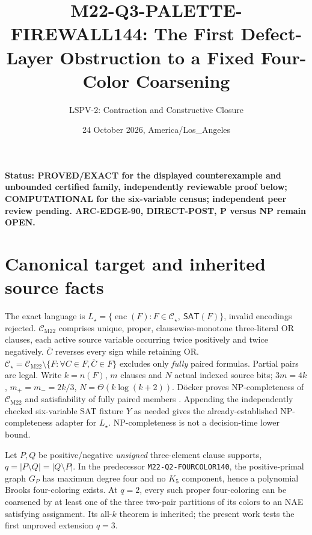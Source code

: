 \documentclass[11pt]{article}
\title{M22-Q3-PALETTE-FIREWALL144: The First Defect-Layer Obstruction to a Fixed Four-Color Coarsening}
\author{LSPV-2: Contraction and Constructive Closure}
\date{24 October 2026, America/Los\_Angeles}
\newcommand{\CM}{\mathcal C_{\mathrm{M22}}}
\newcommand{\CS}{\mathcal C_{\star}}
\newcommand{\SAT}{\mathsf{SAT}}
\begin{document}
\maketitle
\noindent\textbf{Status: PROVED/EXACT for the displayed counterexample and unbounded certified family, independently reviewable proof below; COMPUTATIONAL for the six-variable census; independent peer review pending. ARC-EDGE-90, DIRECT-POST, P versus NP remain OPEN.}

\section{Canonical target and inherited source facts}
The exact language is \(L_\star=\{\operatorname{enc}(F):F\in\CS,\ \SAT(F)\}\), invalid encodings rejected. \(\CM\) comprises unique, proper, clausewise-monotone three-literal OR clauses, each active source variable occurring twice positively and twice negatively. \(\bar C\) reverses every sign while retaining OR. \(\CS=\CM\setminus\{F:\forall C\in F,\bar C\in F\}\) excludes only \emph{fully} paired formulas. Partial pairs are legal. Write \(k=n(F)\), \(m\) clauses and \(N\) actual indexed source bits; \(3m=4k\), \(m_+=m_-=2k/3\), \(N=\Theta(k\log(k+2))\). D\"ocker proves NP-completeness of \(\CM\) and satisfiability of fully paired members \cite{docker}. Appending the independently checked six-variable SAT fixture \(Y\) as needed gives the already-established NP-completeness adapter for \(L_\star\). NP-completeness is not a decision-time lower bound.

Let \(P,Q\) be positive/negative \emph{unsigned} three-element clause supports, \(q=|P\setminus Q|=|Q\setminus P|\). In the predecessor \texttt{M22-Q2-FOURCOLOR140}, the positive-primal graph \(G_P\) has maximum degree four and no \(K_5\) component, hence a polynomial Brooks four-coloring exists. At \(q=2\), every such proper four-coloring can be coarsened by at least one of the three two-pair partitions of its colors to an NAE satisfying assignment. Its all-\(k\) theorem is inherited; the present work tests the first unproved extension \(q=3\).
\end{document}

